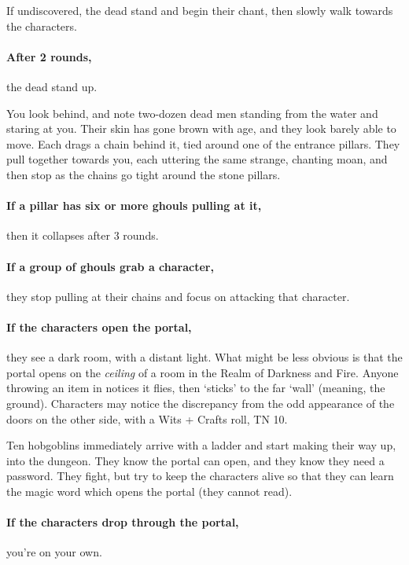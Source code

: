 \begin{multicols}{2}
If undiscovered, the dead stand and begin their chant, then slowly walk towards the characters.

\paragraph{After 2 rounds,}
the dead stand up.

\begin{boxtext}

  You look behind, and note two-dozen dead men standing from the water and staring at you.
  Their skin has gone brown with age, and they look barely able to move.
  Each drags a chain behind it, tied around one of the entrance pillars.
  They pull together towards you, each uttering the same strange, chanting moan, and then stop as the chains go tight around the stone pillars.

\end{boxtext}

\paragraph{If a pillar has six or more ghouls pulling at it,}
then it collapses after 3 rounds.

\paragraph{If a group of ghouls grab a character,}
they stop pulling at their chains and focus on attacking that character.

\paragraph{If the characters open the portal,}
they see a dark room, with a distant light.
What might be less obvious is that the portal opens on the \emph{ceiling} of a room in the Realm of Darkness and Fire.
Anyone throwing an item in notices it flies, then `sticks' to the far `wall' (meaning, the ground).
Characters may notice the discrepancy from the odd appearance of the doors on the other side, with a Wits + Crafts roll, TN 10.

Ten hobgoblins immediately arrive with a ladder and start making their way up, into the dungeon.
They know the portal can open, and they know they need a password.
They fight, but try to keep the characters alive so that they can learn the magic word which opens the portal (they cannot read).

\paragraph{If the characters drop through the portal,}
you're on your own.


\end{multicols}
